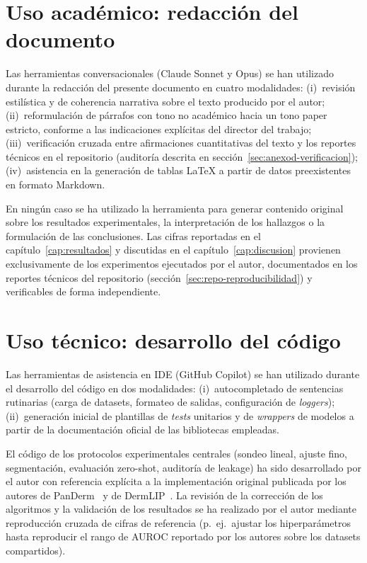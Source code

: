 \section{Uso académico: redacción del documento}
\label{sec:anexod-academico}

Las herramientas conversacionales (Claude Sonnet y Opus) se han
utilizado durante la redacción del presente documento en cuatro
modalidades: (i)~revisión estilística y de coherencia narrativa
sobre el texto producido por el autor;
(ii)~reformulación de párrafos con tono no académico hacia un
tono paper estricto, conforme a las indicaciones explícitas del
director del trabajo;
(iii)~verificación cruzada entre afirmaciones cuantitativas del
texto y los reportes técnicos en el repositorio (auditoría
descrita en sección~\ref{sec:anexod-verificacion});
(iv)~asistencia en la generación de tablas LaTeX a partir de
datos preexistentes en formato Markdown.

En ningún caso se ha utilizado la herramienta para generar
contenido original sobre los resultados experimentales, la
interpretación de los hallazgos o la formulación de las
conclusiones. Las cifras reportadas en el
capítulo~\ref{cap:resultados} y discutidas en el
capítulo~\ref{cap:discusion} provienen exclusivamente de los
experimentos ejecutados por el autor, documentados en los
reportes técnicos del repositorio
(sección~\ref{sec:repo-reproducibilidad}) y verificables de forma
independiente.

\section{Uso técnico: desarrollo del código}
\label{sec:anexod-tecnico}

Las herramientas de asistencia en IDE (GitHub Copilot) se han
utilizado durante el desarrollo del código en dos modalidades:
(i)~autocompletado de sentencias rutinarias (carga de datasets,
formateo de salidas, configuración de \emph{loggers});
(ii)~generación inicial de plantillas de \emph{tests} unitarios y
de \emph{wrappers} de modelos a partir de la documentación
oficial de las bibliotecas empleadas.

El código de los protocolos experimentales centrales
(sondeo lineal, ajuste fino, segmentación, evaluación zero-shot,
auditoría de leakage) ha sido desarrollado por el autor con
referencia explícita a la implementación original publicada por
los autores de PanDerm~\cite{panderm2025} y de
DermLIP~\cite{derm1m}. La revisión de la corrección de los
algoritmos y la validación de los resultados se ha realizado por
el autor mediante reproducción cruzada de cifras de referencia
(p.~ej.~ajustar los hiperparámetros hasta reproducir el rango de
AUROC reportado por los autores sobre los datasets compartidos).

